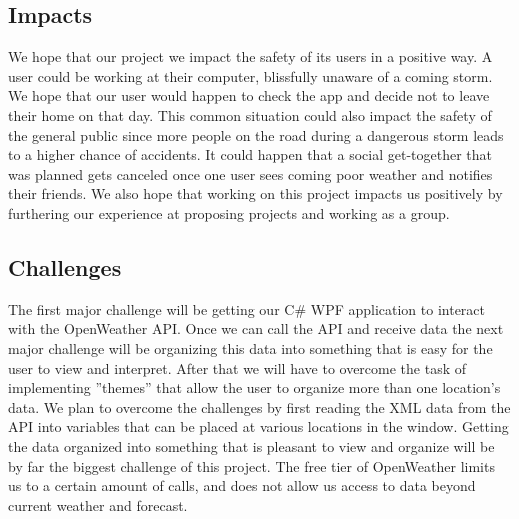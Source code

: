 \documentclass[10pt,conference,onecolumn,compsoc]{IEEEtran}
\begin{document}

\subsection{Impacts}
We hope that our project we impact the safety of its users in a positive way. A user could be working at their computer, blissfully unaware of a coming storm. We hope that our user would happen to check the app and decide not to leave their home on that day. This common situation could also impact the safety of the general public since more people on the road during a dangerous storm leads to a higher chance of accidents. It could happen that a social get-together that was planned gets canceled once one user sees coming poor weather and notifies their friends. We also hope that working on this project impacts us positively by furthering our experience at proposing projects and working as a group.  	



\subsection{Challenges}
	The first major challenge will be getting our C\# WPF application to interact with the OpenWeather API. Once we can call the API and receive data the next major challenge will be organizing this data into something that is easy for the user to view and interpret. After that we will have to overcome the task of implementing ''themes'' that allow the user to organize more than one location's data. We plan to overcome the challenges by first reading the XML data from the API into variables that can be placed at various locations in the window. Getting the data organized into something that is pleasant to view and organize will be by far the biggest challenge of this project. The free tier of OpenWeather limits us to a certain amount of calls, and does not allow us access to data beyond current weather and forecast.
\end{document}
